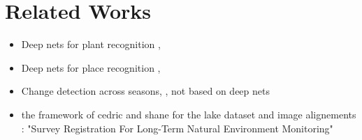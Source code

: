 \section{Related Works}

\begin{itemize}
    \item Deep nets for plant recognition \cite{Reyes2015},
    \item Deep nets for place recognition \cite{Sunderhauf2015},
    \item Change detection across seasons, \cite{Neubert2013}, not based on deep nets
    \item the framework of cedric and shane for the lake dataset and image alignements : "Survey Registration For Long-Term Natural Environment Monitoring"
\end{itemize}

